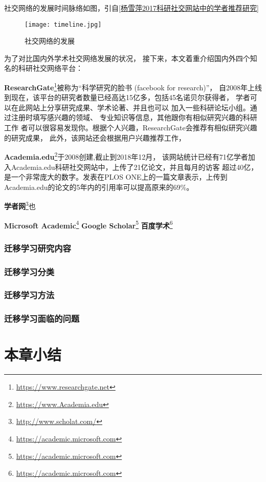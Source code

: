 社交网络的发展时间脉络如图，引自\ref{杨雪萍2017科研社交网站中的学者推荐研究}
\begin{figure}[htbp] %
  \centering
  \texttt{[image: timeline.jpg]}
  \caption{社交网络的发展}
  \label{fig:academic_time}
\end{figure}

为了对比国内外学术社交网络发展的状况，
接下来，本文着重介绍国内外四个知名的科研社交网络平台：%

\textbf{ResearchGate}\footnote{\url{https://www.researchgate.net}}被称为“科学研究的脸书%
(facebook for research)”，%
自2008年上线到现在，该平台的研究者数量已经高达15亿多，包括45名诺贝尔获得者，
学者可以在此网站上分享研究成果、学术论著、并且也可以%
加入一些科研论坛小组。通过注册时填写感兴趣的领域、%
专业知识等信息，其他跟你有相似研究兴趣的科研工作%
者可以很容易发现你。根据个人兴趣，ResearchGate会推荐有相似研究兴趣的研究成果，%
此外，该网站还会根据用户兴趣推荐工作，%

\textbf{Academia.edu}\footnote{\url{https://www.Academia.edu}}于2008创建,截止到2018年12月，%
该网站统计已经有71亿学者加入Academia.edu科研社交网站中，上传了21亿论文，并且每月的访客%
超过40亿，是一个非常庞大的数字。发表在PLOS
ONE上的一篇文章表示，上传到Academia.edu的论文的5年内的引用率可以提高原来的69\%。


\textbf{学者网}\footnote{\url{http://www.scholat.com/}}也%


\textbf{Microsoft Academic}\footnote{\url{https://academic.microsoft.com}}
\textbf{Google Scholar}\footnote{\url{https://academic.microsoft.com}}
\textbf{百度学术}\footnote{\url{https://academic.microsoft.com}}

\subsubsection{迁移学习研究内容}


\subsubsection{迁移学习分类}

\subsubsection{迁移学习方法}

\subsubsection{迁移学习面临的问题}

\section{本章小结}

